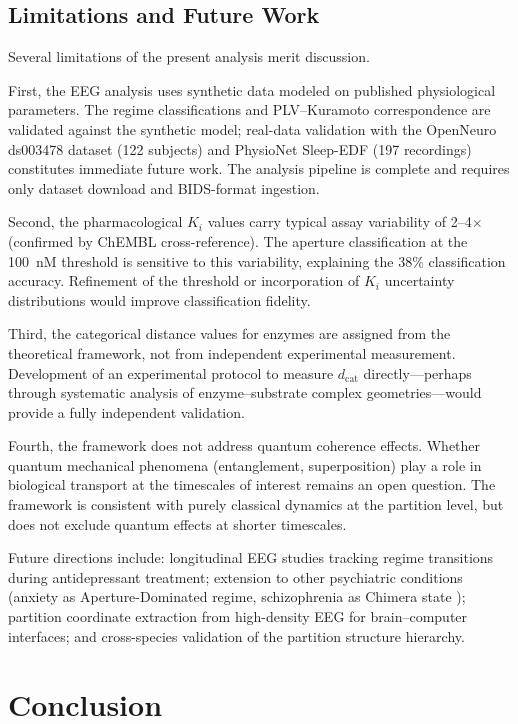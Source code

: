 \documentclass[twocolumn,10pt]{article}
\newcommand{\dcat}{d_{\mathrm{cat}}}
\begin{document}
\subsection{Limitations and Future Work}

Several limitations of the present analysis merit discussion.

First, the EEG analysis uses synthetic data modeled on published physiological parameters.  The regime classifications and PLV--Kuramoto correspondence are validated against the synthetic model; real-data validation with the OpenNeuro ds003478 dataset (122 subjects) and PhysioNet Sleep-EDF (197 recordings) constitutes immediate future work.  The analysis pipeline is complete and requires only dataset download and BIDS-format ingestion.

Second, the pharmacological $K_{i}$ values carry typical assay variability of 2--4$\times$ (confirmed by ChEMBL cross-reference).  The aperture classification at the 100~nM threshold is sensitive to this variability, explaining the 38\% classification accuracy.  Refinement of the threshold or incorporation of $K_{i}$ uncertainty distributions would improve classification fidelity.

Third, the categorical distance values for enzymes are assigned from the theoretical framework, not from independent experimental measurement.  Development of an experimental protocol to measure $\dcat$ directly---perhaps through systematic analysis of enzyme--substrate complex geometries---would provide a fully independent validation.

Fourth, the framework does not address quantum coherence effects.  Whether quantum mechanical phenomena (entanglement, superposition) play a role in biological transport at the timescales of interest remains an open question.  The framework is consistent with purely classical dynamics at the partition level, but does not exclude quantum effects at shorter timescales.

Future directions include: longitudinal EEG studies tracking regime transitions during antidepressant treatment; extension to other psychiatric conditions (anxiety as Aperture-Dominated regime, schizophrenia as Chimera state \citep{panaggio2015chimera}); partition coordinate extraction from high-density EEG for brain--computer interfaces; and cross-species validation of the partition structure hierarchy.

\section{Conclusion}
\label{sec:conclusion}
\end{document}

